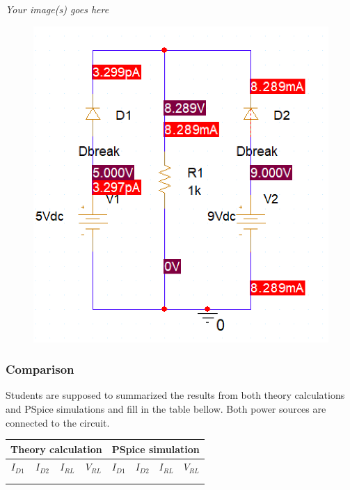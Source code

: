 \textit{Your image(s) goes here}
\begin{figure}[!htp]
    \centering
    \includegraphics[width = 500px]{source/picture/bai_2/sim_ex5.png}
\end{figure}
\newpage
\vspace{8cm}

\subsubsection{Comparison}
Students are supposed to summarized the results from both theory calculations and PSpice simulations and fill in the table bellow. Both power sources are connected to the circuit.\\

\begin{center}
    \begin{tabular}{|l|l|l|l|l|l|l|l|}
        \hline
        \multicolumn{4}{|c|}{Theory calculation} & \multicolumn{4}{c|}{PSpice simulation}                                                                                                             \\ \hline
        \multicolumn{1}{|c|}{$I_{D1}$}           & \multicolumn{1}{c|}{$I_{D2}$}          & \multicolumn{1}{c|}{$I_{RL}$} & \multicolumn{1}{c|}{$V_{RL}$} & $I_{D1}$ & $I_{D2}$ & $I_{RL}$ & $V_{RL}$ \\ \hline
                                                 &                                        &                               &                               &          &          &          &          \\ \hline
                                                 &                                        &                               &                               &          &          &          &          \\ \hline
    \end{tabular}
\end{center}


